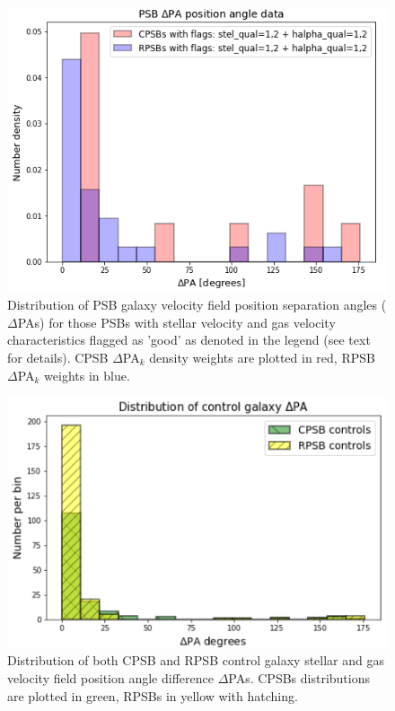 

\begin{figure}
    \centering
    \includegraphics[width=\columnwidth]{images/JupyterPlots/Dist-Delta-PA-All-GoodFlags.png}
    \caption[Distribution of PSB stellar and gas velocity field position angles]{Distribution of PSB galaxy velocity field position separation angles ($\Delta$PAs) for those PSBs with stellar velocity and gas velocity characteristics flagged as 'good' as denoted in the legend (see text for details). CPSB $\Delta$PA$_{k}$ density weights are plotted in red, RPSB $\Delta$PA$_{k}$ weights in blue.}
    \label{fig:deltaPAdistribution}
\end{figure}

\begin{figure}
    \centering
    \includegraphics[width=\columnwidth]{images/JupyterPlots/DIST-Control-DPA-both.png}
    \caption[Distribution of control galaxy $\Delta$PAs]{Distribution of both CPSB and RPSB control galaxy stellar and gas velocity field position angle difference  $\Delta$PAs. CPSBs distributions are plotted in green, RPSBs in yellow with hatching.}
    \label{fig:controlDeltaPAs}
\end{figure}

